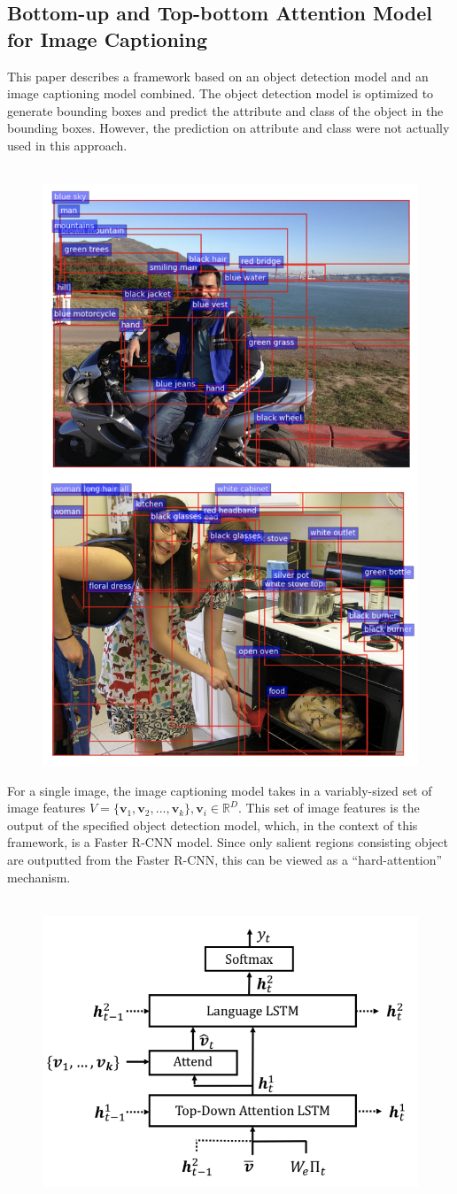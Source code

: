 \documentclass[12pt]{article}
\begin{document}
	\subsection*{Bottom-up and Top-bottom Attention Model for Image Captioning}
	This paper describes a  framework based on an object detection model and an image captioning model combined. The object detection model is optimized to generate bounding boxes and predict the attribute and class of the object in the bounding boxes. However, the prediction on attribute and class were not actually used in this approach.
	\\
	\\
	\begin{figure}[H]
		\centering
		\includegraphics[width=0.5\linewidth]{figures/faster-rcnn-output}
	\end{figure}
	For a single image, the image captioning model takes in a variably-sized set of image features $V=\{\bm{v}_1, \bm{v}_2,...,\bm{v}_k\}, \bm{v}_i \in \mathbb{R}^{D}$. This set of image features is the output of the specified object detection model, which, in the context of this framework, is a Faster R-CNN model. Since only salient regions consisting object are outputted from the Faster R-CNN, this can be viewed as a ``hard-attention'' mechanism.\\
	\\
	\begin{figure}[H]
		\centering
		\includegraphics[width=0.5\linewidth]{figures/image-caption}
	\end{figure}
\end{document}
